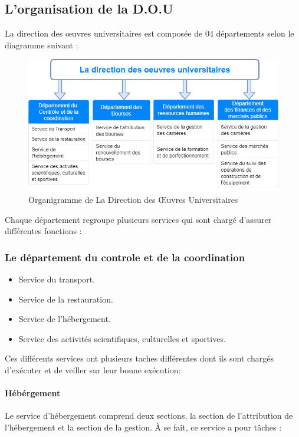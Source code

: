 \subsection{L’organisation de la \acs{D.O.U} \cite{onou-arrete}}
La direction des œuvres universitaires est composée de 04 départements selon le diagramme suivant :

\begin{figure}[H]
    \centering
    \includegraphics[scale=0.6]{DOU/direction-org.jpg}
    \caption{Organigramme de La Direction des Œuvres Universitaires}
\end{figure}

Chaque département regroupe plusieurs services qui sont chargé d'assurer différentes fonctions :

\subsubsection{Le département du controle et de la coordination}
\begin{itemize}
    \item Service du transport.
    \item Service de la restauration.
    \item Service de l'hébergement.
    \item Service des activités scientifiques, culturelles et sportives.\\
\end{itemize}

Ces différents services ont plusieurs taches différentes dont ils sont chargés d'exécuter et de veiller sur leur bonne exécution:

\paragraph{Hébérgement}
Le service d'hébergement comprend deux sections, la section de l'attribution de l'hébergement et la section de la gestion. À se fait, ce service a pour tâches :

